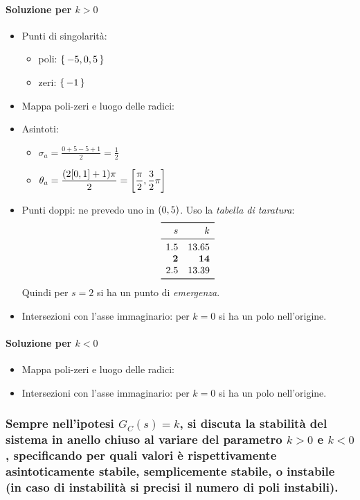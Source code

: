 \paragraph{Soluzione per \(k>0\)}
\begin{itemize}
	\item Punti di singolarità: \begin{itemize}
		\item poli: \(\set{-5,0,5}\)
		\item zeri: \(\set{-1}\)
	\end{itemize}
	\item Mappa poli-zeri e luogo delle radici:
	\item Asintoti: \begin{itemize}
		\item \(\displaystyle \sigma_a = \frac{0+5-5+1}{2} = \frac{1}{2}\)
		\item \(\displaystyle \theta_a = \frac{\qty(2\qty[0,1]+1)\pi}{2} = \qty[\frac{\pi}{2},\frac{3}{2}\pi]\)
	\end{itemize}
	\item Punti doppi: ne prevedo uno in \(\qty(0,5)\). Uso la \emph{tabella di taratura}:
		\[\begin{array}{rr}
			\toprule
			s & k \\
			\midrule
			1.5 & 13.65 \\
			\bm{2} & \bm{14} \\
			2.5 & 13.39 \\
			\bottomrule
		\end{array}\]
		Quindi per \(s=2\) si ha un punto di \emph{emergenza}.
	\item Intersezioni con l'asse immaginario: per \(k=0\) si ha un polo nell'origine.
\end{itemize}

\paragraph{Soluzione per \(k<0\)}
\begin{itemize}
	\item Mappa poli-zeri e luogo delle radici:
	\item Intersezioni con l'asse immaginario: per \(k=0\) si ha un polo nell'origine.
\end{itemize}

\subsubsection{
Sempre nell'ipotesi \(G_C(s)=k\), si discuta la stabilità del sistema in anello chiuso al variare del parametro \(k>0\) e \(k<0\), specificando per quali valori è rispettivamente asintoticamente stabile, semplicemente stabile, o instabile (in caso di instabilità si precisi il numero di poli instabili).
}

